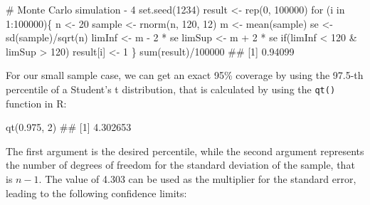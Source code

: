 \documentclass[a4paper,12pt,oneside]{book}
\newenvironment{Shaded}{\begin{snugshade}}{\end{snugshade}}
\newcommand{\DecValTok}[1]{#1}
\newcommand{\FloatTok}[1]{#1}
\newcommand{\SpecialCharTok}[1]{#1}
\newcommand{\CommentTok}[1]{#1}
\newcommand{\DocumentationTok}[1]{#1}
\newcommand{\OtherTok}[1]{#1}
\newcommand{\FunctionTok}[1]{#1}
\newcommand{\ControlFlowTok}[1]{#1}
\newcommand{\NormalTok}[1]{#1}
\begin{document}
\begin{Shaded}
\begin{Highlighting}[]
\CommentTok{\# Monte Carlo simulation {-} 4}
\FunctionTok{set.seed}\NormalTok{(}\DecValTok{1234}\NormalTok{)}
\NormalTok{result }\OtherTok{\textless{}{-}} \FunctionTok{rep}\NormalTok{(}\DecValTok{0}\NormalTok{, }\DecValTok{100000}\NormalTok{)}
\ControlFlowTok{for}\NormalTok{ (i }\ControlFlowTok{in} \DecValTok{1}\SpecialCharTok{:}\DecValTok{100000}\NormalTok{)\{}
\NormalTok{  n }\OtherTok{\textless{}{-}} \DecValTok{20}
\NormalTok{  sample }\OtherTok{\textless{}{-}} \FunctionTok{rnorm}\NormalTok{(n, }\DecValTok{120}\NormalTok{, }\DecValTok{12}\NormalTok{)}
\NormalTok{  m }\OtherTok{\textless{}{-}} \FunctionTok{mean}\NormalTok{(sample)}
\NormalTok{  se }\OtherTok{\textless{}{-}} \FunctionTok{sd}\NormalTok{(sample)}\SpecialCharTok{/}\FunctionTok{sqrt}\NormalTok{(n)}
\NormalTok{  limInf }\OtherTok{\textless{}{-}}\NormalTok{ m }\SpecialCharTok{{-}} \DecValTok{2} \SpecialCharTok{*}\NormalTok{ se}
\NormalTok{  limSup }\OtherTok{\textless{}{-}}\NormalTok{ m }\SpecialCharTok{+} \DecValTok{2} \SpecialCharTok{*}\NormalTok{ se}
  \ControlFlowTok{if}\NormalTok{(limInf }\SpecialCharTok{\textless{}} \DecValTok{120} \SpecialCharTok{\&}\NormalTok{ limSup }\SpecialCharTok{\textgreater{}} \DecValTok{120}\NormalTok{) result[i] }\OtherTok{\textless{}{-}} \DecValTok{1}
\NormalTok{\}}
\FunctionTok{sum}\NormalTok{(result)}\SpecialCharTok{/}\DecValTok{100000}
\DocumentationTok{\#\# [1] 0.94099}
\end{Highlighting}
\end{Shaded}

For our small sample case, we can get an exact 95\% coverage by using the 97.5-th percentile of a Student's t distribution, that is calculated by using the \texttt{qt()} function in R:

\begin{Shaded}
\begin{Highlighting}[]
\FunctionTok{qt}\NormalTok{(}\FloatTok{0.975}\NormalTok{, }\DecValTok{2}\NormalTok{)}
\DocumentationTok{\#\# [1] 4.302653}
\end{Highlighting}
\end{Shaded}

The first argument is the desired percentile, while the second argument represents the number of degrees of freedom for the standard deviation of the sample, that is \(n - 1\). The value of 4.303 can be used as the multiplier for the standard error, leading to the following confidence limits:
\end{document}
